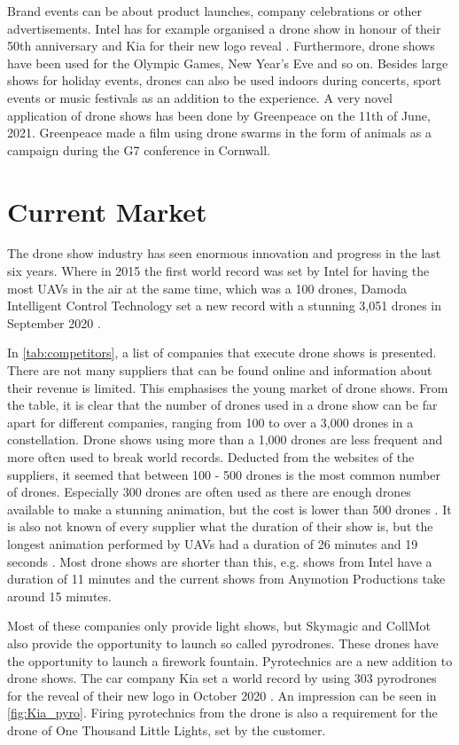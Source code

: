 Brand events can be about product launches, company celebrations or other advertisements. Intel has for example organised a drone show in honour of their 50th anniversary \cite{intelanniversary} and Kia for their new logo reveal \cite{guinnesspyro}. Furthermore, drone shows have been used for the Olympic Games, New Year's Eve and so on. Besides large shows for holiday events, drones can also be used indoors during concerts, sport events or music festivals as an addition to the experience. A very novel application of drone shows has been done by Greenpeace on the 11th of June, 2021. Greenpeace made a film using drone swarms in the form of animals as a campaign during the G7 conference in Cornwall. \cite{greenpeace}

\section{Current Market}\label{sec:currentmarket}
The drone show industry has seen enormous innovation and progress in the last six years. Where in 2015 the first world record was set by Intel for having the most UAVs in the air at the same time, which was a 100 drones, Damoda Intelligent Control Technology set a new record with a stunning 3,051 drones in September 2020 \cite{worldrecords}.

In \autoref{tab:competitors}, a list of companies that execute drone shows is presented. There are not many suppliers that can be found online and information about their revenue is limited. This emphasises the young market of drone shows. From the table, it is clear that the number of drones used in a drone show can be far apart for different companies, ranging from 100 to over a 3,000 drones in a constellation. Drone shows using more than a 1,000 drones are less frequent and more often used to break world records. Deducted from the websites of the suppliers, it seemed that between 100 - 500 drones is the most common number of drones. Especially 300 drones are often used as there are enough drones available to make a stunning animation, but the cost is lower than 500 drones \cite{intel}. It is also not known of every supplier what the duration of their show is, but the longest animation performed by UAVs had a duration of 26 minutes and 19 seconds \cite{guinnesslongestshow}. Most drone shows are shorter than this, e.g. shows from Intel have a duration of 11 minutes \cite{intel} and the current shows from Anymotion Productions take around 15 minutes. 


Most of these companies only provide light shows, but Skymagic and CollMot also provide the opportunity to launch so called pyrodrones. These drones have the opportunity to launch a firework fountain. Pyrotechnics are a new addition to drone shows. The car company Kia set a world record by using 303 pyrodrones for the reveal of their new logo in October 2020 \cite{guinnesspyro}. An impression can be seen in \autoref{fig:Kia_pyro}. Firing pyrotechnics from the drone is also a requirement for the drone of One Thousand Little Lights, set by the customer.

